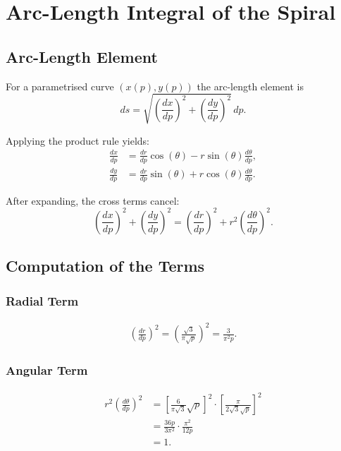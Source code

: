 \chapter{Arc-Length Integral of the Spiral}\label{sec:bogenlaenge}

\section{Arc-Length Element}

For a parametrised curve $(x(p), y(p))$ the arc-length element is
\begin{equation}
ds = \sqrt{\left(\frac{dx}{dp}\right)^2 + \left(\frac{dy}{dp}\right)^2}\, dp.
\end{equation}

Applying the product rule yields:
\begin{equation}
\begin{aligned}
\frac{dx}{dp} &= \frac{dr}{dp}\cos(\theta)
               - r\sin(\theta)\frac{d\theta}{dp}, \\[6pt]
\frac{dy}{dp} &= \frac{dr}{dp}\sin(\theta)
               + r\cos(\theta)\frac{d\theta}{dp}.
\end{aligned}
\end{equation}

After expanding, the cross terms cancel:
\begin{equation}
\left(\frac{dx}{dp}\right)^2
+ \left(\frac{dy}{dp}\right)^2
= \left(\frac{dr}{dp}\right)^2
+ r^2\left(\frac{d\theta}{dp}\right)^2.
\end{equation}

\section{Computation of the Terms}

\subsection*{Radial Term}
\begin{align}
\left(\frac{dr}{dp}\right)^2
= \left(\frac{\sqrt{3}}{\pi\sqrt{p}}\right)^2
= \frac{3}{\pi^2 p}.
\end{align}

\subsection*{Angular Term}
\begin{align}
r^2\left(\frac{d\theta}{dp}\right)^2
&= \left[\frac{6}{\pi\sqrt{3}}\sqrt{p}\right]^2
   \cdot
   \left[\frac{\pi}{2\sqrt{3}\sqrt{p}}\right]^2 \\[4pt]
&= \frac{36p}{3\pi^2}
   \cdot
   \frac{\pi^2}{12p} \\[4pt]
&= 1.
\end{align}

